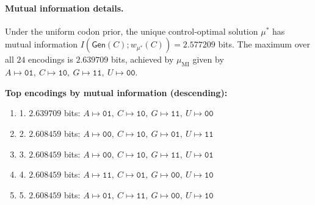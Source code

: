 \paragraph{Mutual information details.}
Under the uniform codon prior, the unique control-optimal solution $\mu^\ast$ has mutual information $I(\mathsf{Gen}(C);w_{\mu^\ast}(C))=2.577209$ bits.
The maximum over all $24$ encodings is $2.639709$ bits, achieved by $\mu_\mathrm{MI}$ given by $A\mapsto \texttt{01},\ C\mapsto \texttt{10},\ G\mapsto \texttt{11},\ U\mapsto \texttt{00}$.

\noindent\textbf{Top encodings by mutual information (descending):}
\begin{enumerate}
\item 1. $2.639709$ bits: $A\mapsto \texttt{01},\ C\mapsto \texttt{10},\ G\mapsto \texttt{11},\ U\mapsto \texttt{00}$
\item 2. $2.608459$ bits: $A\mapsto \texttt{00},\ C\mapsto \texttt{10},\ G\mapsto \texttt{01},\ U\mapsto \texttt{11}$
\item 3. $2.608459$ bits: $A\mapsto \texttt{00},\ C\mapsto \texttt{10},\ G\mapsto \texttt{11},\ U\mapsto \texttt{01}$
\item 4. $2.608459$ bits: $A\mapsto \texttt{11},\ C\mapsto \texttt{01},\ G\mapsto \texttt{00},\ U\mapsto \texttt{10}$
\item 5. $2.608459$ bits: $A\mapsto \texttt{01},\ C\mapsto \texttt{11},\ G\mapsto \texttt{00},\ U\mapsto \texttt{10}$
\end{enumerate}


